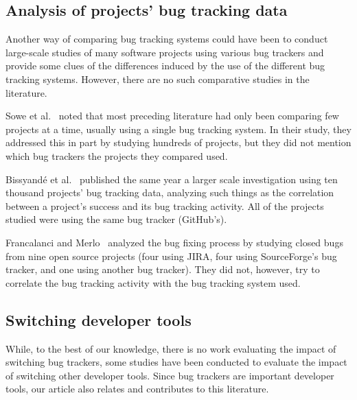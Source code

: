 \documentclass[conference]{IEEEtran}
\begin{document}
\subsection{Analysis of projects' bug tracking data}

Another way of comparing bug tracking systems could have been to conduct large-scale studies of many software projects using various bug trackers and provide some clues of the differences induced by the use of the different bug tracking systems. However, there are no such comparative studies in the literature.

Sowe et al.~\cite{sowe2013multi} noted that most preceding literature had only been comparing few projects at a time, usually using a single bug tracking system. In their study, they addressed this in part by studying hundreds of projects, but they did not mention which bug trackers the projects they compared used.

Bissyandé et al.~\cite{bissyande2013got} published the same year a larger scale investigation using ten thousand projects' bug tracking data, analyzing such things as the correlation between a project's success and its bug tracking activity. All of the projects studied were using the same bug tracker (GitHub's).

Francalanci and Merlo~\cite{francalanci2008empirical} analyzed the bug fixing process by studying closed bugs from nine open source projects (four using JIRA, four using SourceForge's bug tracker, and one using another bug tracker). They did not, however, try to correlate the bug tracking activity with the bug tracking system used.

\subsection{Switching developer tools}

While, to the best of our knowledge, there is no work evaluating the impact of switching bug trackers, some studies have been conducted to evaluate the impact of switching other developer tools. Since bug trackers are important developer tools, our article also relates and contributes to this literature. 
\end{document}
